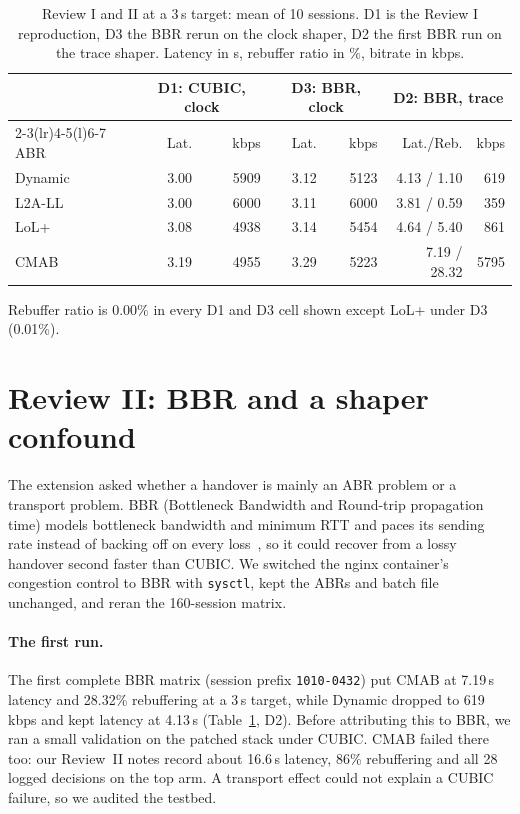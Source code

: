 \documentclass[sigconf]{acmart}
\newcommand{\kbps}{\,kbps\xspace}
\begin{document}
\begin{table}[t]
\caption{Review I and II at a 3\,s target: mean of 10 sessions. D1 is the Review I reproduction, D3 the BBR rerun on the clock shaper, D2 the first BBR run on the trace shaper. Latency in s, rebuffer ratio in \%, bitrate in kbps.}
\label{tab:review12}
\small
\begin{tabular}{@{}lrrrrrr@{}}
\toprule
 & \multicolumn{2}{c}{D1: CUBIC, clock} & \multicolumn{2}{c}{D3: BBR, clock} & \multicolumn{2}{c}{D2: BBR, trace} \\
\cmidrule(lr){2-3}\cmidrule(lr){4-5}\cmidrule(l){6-7}
ABR & Lat. & kbps & Lat. & kbps & Lat./Reb. & kbps \\
\midrule
Dynamic & 3.00 & 5909 & 3.12 & 5123 & 4.13 / 1.10 & 619 \\
L2A-LL  & 3.00 & 6000 & 3.11 & 6000 & 3.81 / 0.59 & 359 \\
LoL+    & 3.08 & 4938 & 3.14 & 5454 & 4.64 / 5.40 & 861 \\
CMAB    & 3.19 & 4955 & 3.29 & 5223 & 7.19 / 28.32 & 5795 \\
\bottomrule
\end{tabular}

\smallskip
\footnotesize Rebuffer ratio is 0.00\% in every D1 and D3 cell shown except LoL+ under D3 (0.01\%).
\end{table}

\section{Review II: BBR and a shaper confound}
\label{sec:bbr}

The extension asked whether a handover is mainly an ABR problem or a transport problem. BBR (Bottleneck Bandwidth and Round-trip propagation time) models bottleneck bandwidth and minimum RTT and paces its sending rate instead of backing off on every loss~\cite{cardwell2016bbr}, so it could recover from a lossy handover second faster than CUBIC. We switched the nginx container's congestion control to BBR with \texttt{sysctl}, kept the ABRs and batch file unchanged, and reran the 160-session matrix.

\paragraph{The first run.} The first complete BBR matrix (session prefix \texttt{1010-0432}) put CMAB at 7.19\,s latency and 28.32\% rebuffering at a 3\,s target, while Dynamic dropped to 619\kbps and kept latency at 4.13\,s (Table~\ref{tab:review12}, D2). Before attributing this to BBR, we ran a small validation on the patched stack under CUBIC. CMAB failed there too: our Review~II notes record about 16.6\,s latency, 86\% rebuffering and all 28 logged decisions on the top arm. A transport effect could not explain a CUBIC failure, so we audited the testbed.
\end{document}
